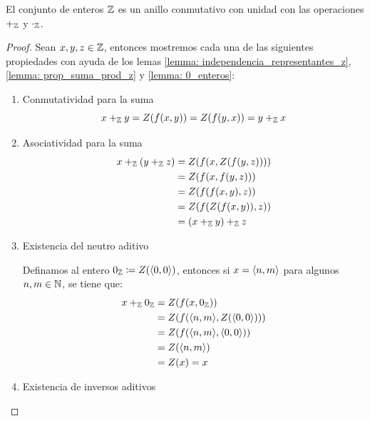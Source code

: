 \begin{theorem}
	\label{theo: enteros_anillo}
	El conjunto de enteros $\ZZ$ es un anillo conmutativo con unidad con las operaciones $+_{\ZZ}$ y $\cdot_{\ZZ}$.
\end{theorem}

\begin{proof}
	Sean $x, y, z\in\ZZ$, entonces mostremos cada una de las siguientes propiedades con ayuda de los lemas \ref{lemma: independencia_representantes_z}, \ref{lemma: prop_suma_prod_z} y \ref{lemma: 0_enteros}:

	\begin{enumerate}
		\item Conmutatividad para la suma
		\[
			x +_{\ZZ} y = Z\pa*{f\pa*{x, y}} = Z\pa*{f\pa*{y, x}} = y +_{\ZZ} x
		\]
		\item Asociatividad para la suma
		\begin{align*}
			x +_{\ZZ}\pa*{y +_{\ZZ} z} &= Z\pa*{f\pa*{x, Z\pa*{f\pa*{y, z}}}}\\
			&= Z\pa*{f\pa*{x, f\pa*{y, z}}}\\
			&= Z\pa*{f\pa*{f\pa*{x, y}, z}}\\
			&= Z\pa*{f\pa*{Z\pa*{f\pa*{x, y}}, z}}\\
			&=\pa*{x +_{\ZZ} y} +_{\ZZ} z
		\end{align*}
		\item Existencia del neutro aditivo

		Definamos al entero $0_{\ZZ}\coloneqq Z\pa*{\inner*{0, 0}}$, entonces si $x =\inner*{n, m}$ para algunos $n, m\in\NN$, se tiene que:
		\begin{align*}
			x +_{\ZZ} 0_{\ZZ} &= Z\pa*{f\pa*{x, 0_{\ZZ}}}\\
			&= Z\pa*{f\pa*{\inner*{n, m},Z\pa*{\inner*{0, 0}}}}\\
			&= Z\pa*{f\pa*{\inner*{n, m},\inner*{0, 0}}}\\
			&= Z\pa*{\inner*{n, m}}\\
			&= Z\pa*{x} = x
		\end{align*}
		\item Existencia de inversos aditivos


\end{enumerate}
\end{proof}

